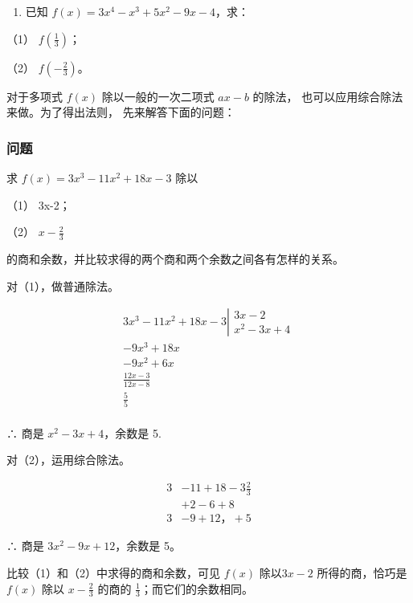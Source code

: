\begin{enumerate}[start=3]
\item
  已知 \(f(x) = 3x^4 - x^3 + 5x^2 - 9x - 4\)，求：
\end{enumerate}

（1） \(f\left(\frac{1}{3}\right)\)；

（2） \(f\left(-\frac{2}{3}\right)\)。

对于多项式 \(f(x)\) 除以一般的一次二项式 \(ax - b\) 的除法，
也可以应用综合除法来做。为了得出法则， 先来解答下面的问题：

\subsubsection{问题}

求 \(f(x) = 3x^{3} - 11x^{2} + 18x - 3\) 除以

（1） 3x-2；

（2） \(x - \frac{2}{3}\)

的商和余数，并比较求得的两个商和两个余数之间各有怎样的关系。

对（1），做普通除法。

\[
\begin{array}{l} 3 x ^ {3} - 11 x ^ {2} + 18 x - 3 \left| \begin{array}{l} 3 x - 2 \\ \hline x ^ {2} - 3 x + 4 \end{array} \right. \\ - 9 x ^ {3} + 18 x \\ - 9 x ^ {2} + 6 x \\ \frac {12 x - 3}{12 x - 8} \\ \frac {5}{5} \\ \end{array}
\]

∴ 商是 \(x^{2}-3x+4\)，余数是 5.

对（2），运用综合除法。

\[
\begin{array}{rl} {3} & {- 11 + 18 - 3 \frac {2}{3}} \\ & {+ 2 - 6 + 8} \\ \hline {3} & {- 9 + 12\text{，} + 5} \end{array}
\]

∴ 商是 \(3x^{2}-9x+12\)，余数是 5。

比较（1）和（2）中求得的商和余数，可见 \(f(x)\) 除以\(3x - 2\)
所得的商，恰巧是 \(f(x)\) 除以 \(x - \frac{2}{3}\) 的商的
\(\frac{1}{3}\)；而它们的余数相同。

